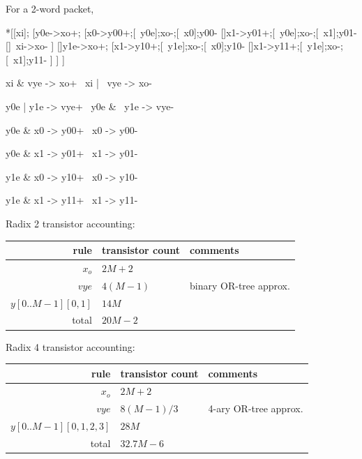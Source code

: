 \documentclass{article}
\begin{document}
\noindent
For a 2-word packet,

\begin{hse}
*[[xi];
  [y0e->xo+;
    [x0->y00+;[~y0e];xo-;[~x0];y00-
    []x1->y01+;[~y0e];xo-;[~x1];y01-
    []~xi->xo-
    ]
  []y1e->xo+;
    [x1->y10+;[~y1e];xo-;[~x0];y10-
    []x1->y11+;[~y1e];xo-;[~x1];y11-
    ]
  ]
 ]
\end{hse}

\begin{hse}
xi & vye -> xo+
~xi | ~vye -> xo-
\end{hse}

\begin{prs2}
y0e | y1e -> vye+
~y0e & ~y1e -> vye-
\end{prs2}

\begin{prs2}
y0e & x0 -> y00+
~x0 -> y00-

y0e & x1 -> y01+
~x1 -> y01-
\end{prs2}

\begin{prs2}
y1e & x0 -> y10+
~x0 -> y10-

y1e & x1 -> y11+
~x1 -> y11-
\end{prs2}

\noindent
Radix 2 transistor accounting:

\begin{center}
    \begin{tabular}{|r|l|l|}
    \hline
    rule & transistor count & comments \\ \hline
    $x_o$ & $2M+2$ & \\ \hline
    $vye$ & $4(M-1)$ & binary OR-tree approx. \\ \hline
    $y[0..M-1][0,1]$ & $14M$ & \\ \hline
    \hline total & $20M-2$ & \\ \hline
    \end{tabular}
\end{center}

\noindent
Radix 4 transistor accounting:

\begin{center}
    \begin{tabular}{|r|l|l|}
    \hline
    rule & transistor count & comments \\ \hline
    $x_o$ & $2M+2$ & \\ \hline
    $vye$ & $8(M-1)/3$ & 4-ary OR-tree approx. \\ \hline
    $y[0..M-1][0,1,2,3]$ & $28M$ & \\ \hline
    \hline total & $32.7M-6$ & \\ \hline
    \end{tabular}
\end{center}
\end{document}
